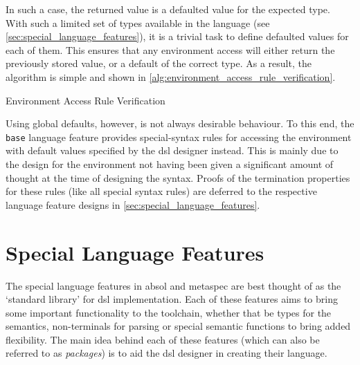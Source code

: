 In such a case, the returned value is a defaulted value for the expected type.
With such a limited set of types available in the language (see \autoref{sec:special_language_features}), it is a trivial task to define defaulted values for each of them.
This ensures that any environment access will either return the previously stored value, or a default of the correct type. 
As a result, the algorithm is simple and shown in \autoref{alg:environment_access_rule_verification}.

\begin{algorithm}[!htb]
\begin{algorithmic}
    \State {}
\EndFunction
\end{algorithmic}
\caption{Environment Access Rule Verification}
\label{alg:environment_access_rule_verification}
\end{algorithm}

Using global defaults, however, is not always desirable behaviour. 
To this end, the \texttt{base} language feature provides special-syntax rules for accessing the environment with default values specified by the \gls{dsl} designer instead.
This is mainly due to the design for the environment not having been given a significant amount of thought at the time of designing the syntax.
Proofs of the termination properties for these rules (like all special syntax rules) are deferred to the respective language feature designs in \autoref{sec:special_language_features}.




\section{Special Language Features} %
\label{sec:special_language_features}

The special language features in \gls{absol} and \gls{metaspec} are best thought of as the `standard library' for \gls{dsl} implementation.
Each of these features aims to bring some important functionality to the toolchain, whether that be types for the semantics, non-terminals for parsing or special semantic functions to bring added flexibility. 
The main idea behind each of these features (which can also be referred to as \textit{packages}) is to aid the \gls{dsl} designer in creating their language. \\

